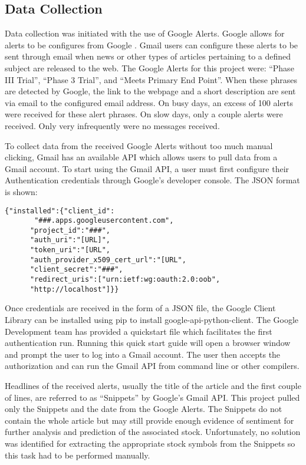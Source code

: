 \documentclass[sigconf]{acmart}
\begin{document}
\subsection{Data Collection}
Data collection was initiated with the use of Google Alerts. Google allows for alerts to be configures from Google \cite{www-googleAlerts}. Gmail users can configure these alerts to be sent through email when news or other types of articles pertaining to a defined subject are released to the web. The Google Alerts for this project were: ``Phase III Trial'', ``Phase 3 Trial'', and ``Meets Primary End Point''. When these phrases are detected by Google, the link to the webpage and a short description are sent via email to the configured email address. On busy days, an excess of 100 alerts were received for these alert phrases. On slow days, only a couple alerts were received.  Only very infrequently were no messages received. 

To collect data from the received Google Alerts without too much manual clicking, Gmail has an available API which allows users to pull data from a Gmail account. To start using the Gmail API, a user must first configure their Authentication credentials through Google's developer console. The JSON format is shown:
\begin{verbatim}
{"installed":{"client_id":
       "###.apps.googleusercontent.com",
      "project_id":"###",
      "auth_uri":"[URL]",
      "token_uri":"[URL",
      "auth_provider_x509_cert_url":"[URL",
      "client_secret":"###",
      "redirect_uris":["urn:ietf:wg:oauth:2.0:oob",
      "http://localhost"]}}
\end{verbatim}
Once credentials are received in the form of a JSON file, the Google Client Library can be installed using pip to install google-api-python-client. The Google Development team has provided a quickstart file which facilitates the first authentication run. Running this quick start guide will open a browser window and prompt the user to log into a Gmail account. The user then accepts the authorization and can run the Gmail API from command line or other compilers. 

 Headlines of the received alerts, usually the title of the article and the first couple of lines, are referred to as ``Snippets'' by Google's Gmail API. This project pulled only the Snippets and the date from the Google Alerts. The Snippets do not contain the whole article but may still provide enough evidence of sentiment for further analysis and prediction of the associated stock. Unfortunately, no solution was identified for extracting the appropriate stock symbols from the Snippets so this task had to be performed manually. 
\end{document}
